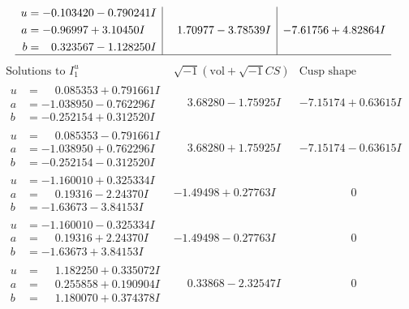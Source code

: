 \documentclass[1p]{elsarticle_modified}
\theoremstyle{definition}
\newcommand{\I}{\sqrt{-1}}
\begin{document}
$$\begin{array}{c|c|c}
\begin{aligned}
u &= -0.103420 - 0.790241 I \\
a &= -0.96997 + 3.10450 I \\
b &= \phantom{-}0.323567 - 1.128250 I\end{aligned}
 & \phantom{-}1.70977 - 3.78539 I & -7.61756 + 4.82864 I\\
 \hline 
 \end{array}$$\newpage$$\begin{array}{c|c|c}  
\text{Solutions to }I^u_{1}& \I (\text{vol} + \sqrt{-1}CS) & \text{Cusp shape}\\
 \hline 
\begin{aligned}
u &= \phantom{-}0.085353 + 0.791661 I \\
a &= -1.038950 - 0.762296 I \\
b &= -0.252154 + 0.312520 I\end{aligned}
 & \phantom{-}3.68280 - 1.75925 I & -7.15174 + 0.63615 I \\ \hline\begin{aligned}
u &= \phantom{-}0.085353 - 0.791661 I \\
a &= -1.038950 + 0.762296 I \\
b &= -0.252154 - 0.312520 I\end{aligned}
 & \phantom{-}3.68280 + 1.75925 I & -7.15174 - 0.63615 I \\ \hline\begin{aligned}
u &= -1.160010 + 0.325334 I \\
a &= \phantom{-}0.19316 - 2.24370 I \\
b &= -1.63673 - 3.84153 I\end{aligned}
 & -1.49498 + 0.27763 I & \phantom{-0.000000 } 0 \\ \hline\begin{aligned}
u &= -1.160010 - 0.325334 I \\
a &= \phantom{-}0.19316 + 2.24370 I \\
b &= -1.63673 + 3.84153 I\end{aligned}
 & -1.49498 - 0.27763 I & \phantom{-0.000000 } 0 \\ \hline\begin{aligned}
u &= \phantom{-}1.182250 + 0.335072 I \\
a &= \phantom{-}0.255858 + 0.190904 I \\
b &= \phantom{-}1.180070 + 0.374378 I\end{aligned}
 & \phantom{-}0.33868 - 2.32547 I & \phantom{-0.000000 } 0 \\ \hline\begin{aligned}

\end{aligned}
\end{array}$$
\end{document}
